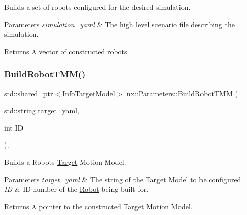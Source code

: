 Builds a set of robots configured for the desired simulation. 
\begin{DoxyParams}{Parameters}
{\em simulation\+\_\+yaml} & The high level scenario file describing the simulation. \\
\hline
\end{DoxyParams}
\begin{DoxyReturn}{Returns}
A vector of constructed robots. 
\end{DoxyReturn}
\mbox{\label{classnx_1_1Parameters_afcb2f37e60548d2c4b25382a8e1dd8a0}} 
\subsubsection{\texorpdfstring{Build\+Robot\+T\+M\+M()}{BuildRobotTMM()}}
{\footnotesize\ttfamily std\+::shared\+\_\+ptr$<$\hyperlink{classnx_1_1InfoTargetModel}{Info\+Target\+Model}$>$ nx\+::\+Parameters\+::\+Build\+Robot\+T\+MM (\begin{DoxyParamCaption}\item[{std\+::string}]{target\+\_\+yaml,  }\item[{int}]{ID }\end{DoxyParamCaption})\hspace{0.3cm}{\ttfamily [inline]}, {\ttfamily [protected]}}

Builds a Robots \hyperlink{structnx_1_1Target}{Target} Motion Model. 
\begin{DoxyParams}{Parameters}
{\em target\+\_\+yaml} & The string of the \hyperlink{structnx_1_1Target}{Target} Model to be configured. \\
\hline
{\em ID} & ID number of the \hyperlink{classnx_1_1Robot}{Robot} being built for. \\
\hline
\end{DoxyParams}
\begin{DoxyReturn}{Returns}
A pointer to the constructed \hyperlink{structnx_1_1Target}{Target} Motion Model. 
\end{DoxyReturn}
\mbox{\label{classnx_1_1Parameters_a554240e99a3763a48d2eba55a1e0eaa7}} 
